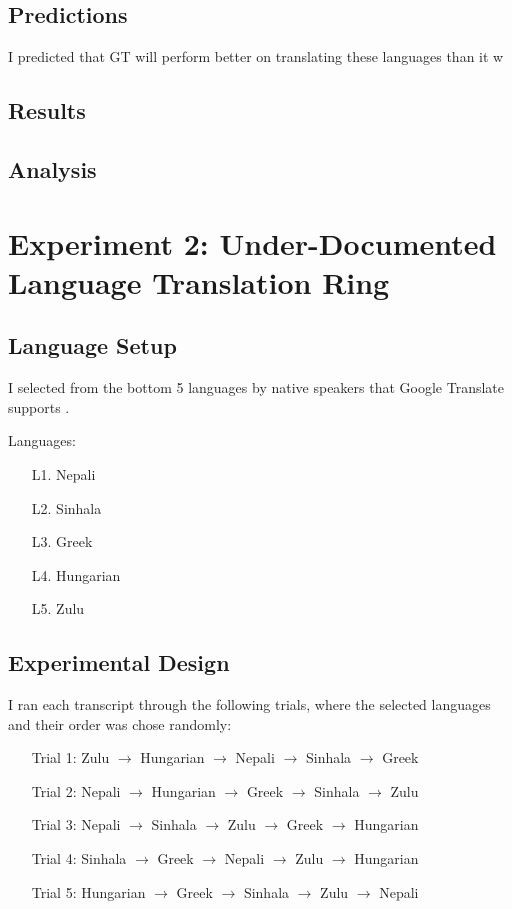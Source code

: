 \documentclass{article}
\begin{document}
\subsection{Predictions}


I predicted that GT will perform better on translating these languages than it w


\subsection{Results}\subsection{Analysis}\section{Experiment 2: Under-Documented Language Translation Ring}\subsection{Language Setup}


I selected from the bottom 5 languages by native speakers that Google Translate supports .




\vspace{1em} \noindent
Languages:
\begin{enumerate}
  \item[L1.] Nepali
  \item[L2.] Sinhala
  \item[L3.] Greek
  \item[L4.] Hungarian
  \item[L5.] Zulu
\end{enumerate}

\subsection{Experimental Design}


I ran each transcript through the following trials, where the selected languages and their order was chose randomly:




\begin{enumerate}
  \item[] Trial 1: Zulu $\rightarrow$ Hungarian $\rightarrow$ Nepali $\rightarrow$ Sinhala $\rightarrow$ Greek
  \item[] Trial 2: Nepali $\rightarrow$ Hungarian $\rightarrow$ Greek $\rightarrow$ Sinhala $\rightarrow$ Zulu
  \item[] Trial 3: Nepali $\rightarrow$ Sinhala $\rightarrow$ Zulu $\rightarrow$ Greek $\rightarrow$ Hungarian
  \item[] Trial 4: Sinhala $\rightarrow$ Greek $\rightarrow$ Nepali $\rightarrow$ Zulu $\rightarrow$ Hungarian
  \item[] Trial 5: Hungarian $\rightarrow$ Greek $\rightarrow$ Sinhala $\rightarrow$ Zulu $\rightarrow$ Nepali
\end{enumerate}
\end{document}
